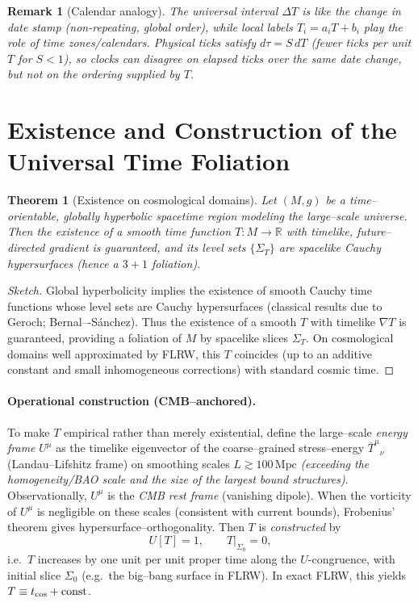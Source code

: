\documentclass[12pt]{article}
\theoremstyle{plain}
\newtheorem{theorem}{Theorem}
\newtheorem{remark}{Remark}
\begin{document}
\begin{remark}[Calendar analogy]
The universal interval $\Delta T$ is like the change in date stamp (non-repeating, global order), while local labels $T_i=a_iT+b_i$ play the role of time zones/calendars. Physical ticks satisfy $d\tau=S\,dT$ (fewer ticks per unit $T$ for $S<1$), so clocks can disagree on elapsed ticks over the same date change, but not on the ordering supplied by $T$.
\end{remark}

\section*{Existence and Construction of the Universal Time Foliation}
\label{app:existence}
\begin{theorem}[Existence on cosmological domains]
\label{thm:existenceT}
Let $(M,g)$ be a time–orientable, globally hyperbolic spacetime region modeling the large–scale universe. Then the existence of a smooth \emph{time function} $T:M\to\mathbb{R}$ with timelike, future–directed gradient is guaranteed, and its level sets $\{\Sigma_T\}$ are spacelike Cauchy hypersurfaces (hence a $3{+}1$ foliation).
\end{theorem}

\begin{proof}[Sketch]
Global hyperbolicity implies the existence of smooth Cauchy time functions whose level sets are Cauchy hypersurfaces (classical results due to Geroch; Bernal–-S\'anchez). Thus the existence of a smooth $T$ with timelike $\nabla T$ is guaranteed, providing a foliation of $M$ by spacelike slices $\Sigma_T$. On cosmological domains well approximated by FLRW, this $T$ coincides (up to an additive constant and small inhomogeneous corrections) with standard cosmic time.
\end{proof}

\paragraph{Operational construction (CMB–anchored).}
To make $T$ empirical rather than merely existential, define the large–scale \emph{energy frame} $U^\mu$ as the timelike eigenvector of the coarse–grained stress–energy $\overline{T}^{\mu}{}_{\nu}$ (Landau–Lifshitz frame) on smoothing scales $L\gtrsim 100\,\text{Mpc}$ \emph{(exceeding the homogeneity/BAO scale and the size of the largest bound structures)}. Observationally, $U^\mu$ is the \emph{CMB rest frame} (vanishing dipole). When the vorticity of $U^\mu$ is negligible on these scales (consistent with current bounds), Frobenius’ theorem gives hypersurface–orthogonality. Then $T$ is \emph{constructed} by
\[
U[T]=1,\qquad T\big|_{\Sigma_0}=0,
\]
i.e.\ $T$ increases by one unit per unit proper time along the $U$-congruence, with initial slice $\Sigma_0$ (e.g.\ the big–bang surface in FLRW). In exact FLRW, this yields $T\equiv t_{\rm cos}+\text{const}$.
\end{document}
